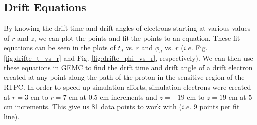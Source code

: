 \subsection{Drift Equations}
By knowing the drift time and drift angles of electrons starting at various values of $r$ and $z$, we can plot the points and fit the points to an equation. These fit equations can be seen in the plots of $t_d$ vs. $r$ and $\phi_d$ vs. $r$ ($i.e.$ Fig. \ref{fig:drifte_t_vs_r} and Fig. \ref{fig:drifte_phi_vs_r}, respectively). We can then use these equations in GEMC to find the drift time and drift angle of a drift electron created at any point along the path of the proton in the sensitive region of the RTPC. In order to speed up simulation efforts, simulation electrons were created at $r = 3$ cm to $r = 7$ cm at $0.5$ cm increments and $z = -19$ cm to $z = 19$ cm at $5$ cm increments. This give us 81 data points to work with ($i.e.$ 9 points per fit line).

